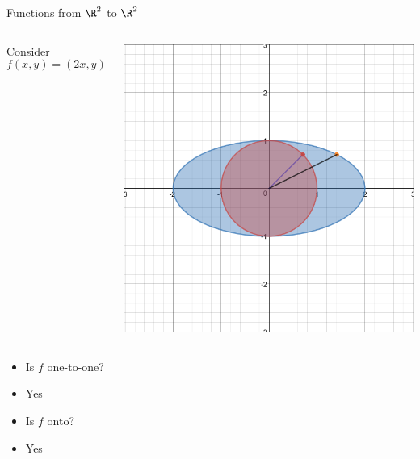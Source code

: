 \documentclass{beamer}
\begin{document}
\begin{frame}{Functions from $\R^2$ to $\R^2$}

\begin{columns}
\column[T]{5cm}
Consider
$$f(x,y) = (2x, y)$$

\column[T]{5cm}
\includegraphics[scale=0.25]{circle-to-elipse}
\end{columns}
\begin{itemize}
\item Is $f$ one-to-one?
\item Yes
\item Is $f$ onto?
\item Yes
\end{itemize}

\end{frame}
\end{document}
